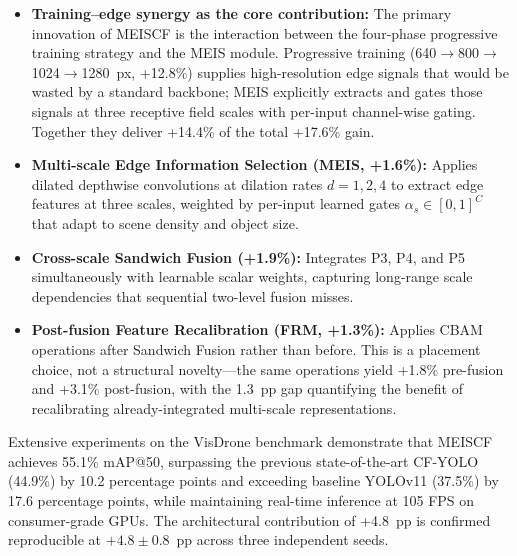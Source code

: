 \documentclass[preprint,12pt]{elsarticle}
\begin{document}
\begin{itemize}

\item \textbf{Training--edge synergy as the core contribution:} The primary
innovation of MEISCF is the interaction between the four-phase progressive
training strategy and the MEIS module. Progressive training
(640$\rightarrow$800$\rightarrow$1024$\rightarrow$1280~px, +12.8\%) supplies
high-resolution edge signals that would be wasted by a standard backbone; MEIS
explicitly extracts and gates those signals at three receptive field scales with
per-input channel-wise gating. Together they deliver +14.4\% of the total
+17.6\% gain.

\item \textbf{Multi-scale Edge Information Selection (MEIS, +1.6\%):} Applies
dilated depthwise convolutions at dilation rates $d{=}1,2,4$ to extract edge
features at three scales, weighted by per-input learned gates $\alpha_s \in
[0,1]^C$ that adapt to scene density and object size.

\item \textbf{Cross-scale Sandwich Fusion (+1.9\%):} Integrates P3, P4, and P5
simultaneously with learnable scalar weights, capturing long-range scale
dependencies that sequential two-level fusion misses.

\item \textbf{Post-fusion Feature Recalibration (FRM, +1.3\%):} Applies
CBAM~\cite{cbam} operations after Sandwich Fusion rather than before. This is a
placement choice, not a structural novelty---the same operations yield +1.8\%
pre-fusion and +3.1\% post-fusion, with the 1.3~pp gap quantifying the benefit
of recalibrating already-integrated multi-scale representations.

\end{itemize}

Extensive experiments on the VisDrone benchmark demonstrate that MEISCF achieves
55.1\% mAP@50, surpassing the previous state-of-the-art CF-YOLO (44.9\%) by 10.2
percentage points and exceeding baseline YOLOv11 (37.5\%) by 17.6 percentage
points, while maintaining real-time inference at 105 FPS on consumer-grade GPUs.
The architectural contribution of +4.8~pp is confirmed reproducible at
$+4.8\pm0.8$~pp across three independent seeds.


\end{document}
